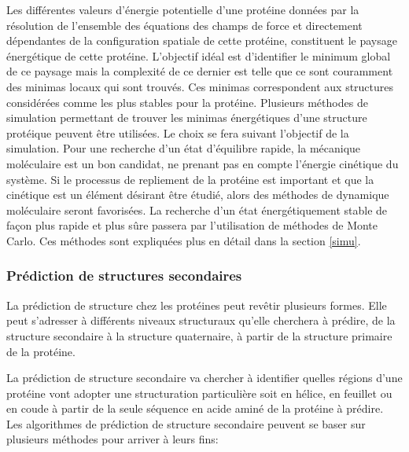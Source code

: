 Les différentes valeurs d'énergie potentielle d'une protéine données par la résolution de l'ensemble des équations des champs de force et directement dépendantes de la configuration spatiale de cette protéine, constituent le paysage énergétique de cette protéine. L’objectif idéal est d'identifier le minimum global de ce paysage mais la complexité de ce dernier est telle que ce sont couramment des minimas locaux qui sont trouvés. Ces minimas correspondent aux structures considérées comme les plus stables pour la protéine. Plusieurs méthodes de simulation permettant de trouver les minimas énergétiques d'une structure protéique peuvent être utilisées. Le choix se fera suivant l'objectif de la simulation. Pour une recherche d'un état d'équilibre rapide, la mécanique moléculaire est un bon candidat, ne prenant pas en compte l'énergie cinétique du système. Si le processus de repliement de la protéine est important et que la cinétique est un élément désirant être étudié, alors des méthodes de dynamique moléculaire seront favorisées. La recherche d'un état énergétiquement stable de façon plus rapide et plus sûre passera par l'utilisation de méthodes de Monte Carlo. Ces méthodes sont expliquées plus en détail dans la section \ref{simu}. 

\subsubsection{Prédiction de structures secondaires} \label{prediction_struct_second}

La prédiction de structure chez les protéines peut revêtir plusieurs formes. Elle peut s'adresser à différents niveaux structuraux qu'elle cherchera à prédire, de la structure secondaire à la structure quaternaire, à partir de la structure primaire de la protéine.

La prédiction de structure secondaire va chercher à identifier quelles régions d'une protéine vont adopter une structuration particulière soit en hélice, en feuillet ou en coude à partir de la seule séquence en acide aminé de la protéine à prédire. Les algorithmes de prédiction de structure secondaire peuvent se baser sur plusieurs méthodes pour arriver à leurs fins:

